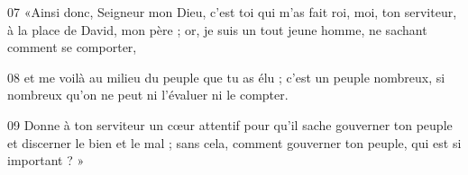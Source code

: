 
07 «Ainsi donc, Seigneur mon Dieu, c’est toi qui m’as fait roi, moi, ton serviteur, à la place de David, mon père ; or, je suis un tout jeune homme, ne sachant comment se comporter,

08 et me voilà au milieu du peuple que tu as élu ; c’est un peuple nombreux, si nombreux qu’on ne peut ni l’évaluer ni le compter.

09 Donne à ton serviteur un cœur attentif pour qu’il sache gouverner ton peuple et discerner le bien et le mal ; sans cela, comment gouverner ton peuple, qui est si important ? »
